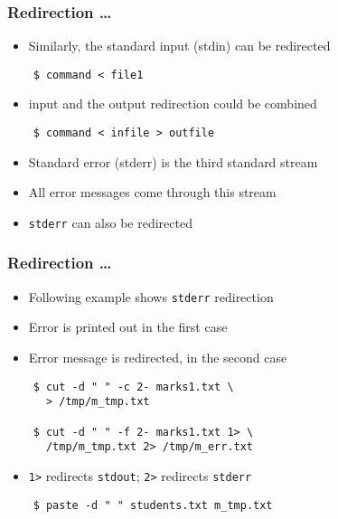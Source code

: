 \documentclass[12pt,compress]{beamer}
\begin{document}
\begin{frame}[fragile]
  \frametitle{Redirection \ldots} 
  \begin{itemize}
  \item Similarly, the standard input (stdin) can be redirected
  \end{itemize}
  \begin{lstlisting}
    $ command < file1
  \end{lstlisting} %
  \begin{itemize}
  \item input and the output redirection could be combined
  \end{itemize}
  \begin{lstlisting}
    $ command < infile > outfile
  \end{lstlisting} %
  \begin{itemize}
  \item Standard error (stderr) is the third standard stream
  \item All error messages come through this stream
  \item \texttt{stderr} can also be redirected
  \end{itemize}
\end{frame}

\begin{frame}[fragile]
  \frametitle{Redirection \ldots} 
  \begin{itemize}
  \item Following example shows \texttt{stderr} redirection
  \item Error is printed out in the first case
  \item Error message is redirected, in the second case
  \end{itemize}
  \begin{lstlisting}
    $ cut -d " " -c 2- marks1.txt \
      > /tmp/m_tmp.txt

    $ cut -d " " -f 2- marks1.txt 1> \
      /tmp/m_tmp.txt 2> /tmp/m_err.txt
  \end{lstlisting} %
  \begin{itemize}
  \item \texttt{1>} redirects \texttt{stdout}; \texttt{2>} redirects
    \texttt{stderr} 
  \end{itemize}
  \begin{lstlisting}
    $ paste -d " " students.txt m_tmp.txt
  \end{lstlisting} %
\end{frame}
\end{document}
